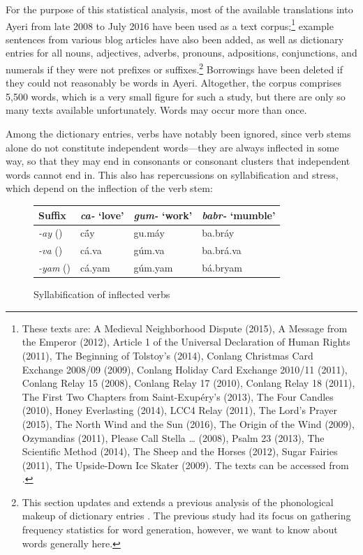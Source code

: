 For the purpose of this statistical analysis, most of the available 
translations into Ayeri from late 2008 to July 2016 have been used as a text 
corpus;\footnote{These texts are:
A Medieval Neighborhood Dispute (2015),
A Message from the Emperor (2012),
Article 1 of the Universal Declaration of Human Rights (2011),
The Beginning of Tolstoy's  (2014),
Conlang Christmas Card Exchange 2008/09 (2009),
Conlang Holiday Card Exchange 2010/11 (2011),
Conlang Relay 15 (2008),
Conlang Relay 17 (2010),
Conlang Relay 18 (2011),
The First Two Chapters from Saint-Exupéry's  (2013),
The Four Candles (2010),
Honey Everlasting (2014),
LCC4 Relay (2011),
The Lord's Prayer (2015),
The North Wind and the Sun (2016),
The Origin of the Wind (2009),
Ozymandias (2011),
Please Call Stella … (2008),
Psalm 23 (2013),
The Scientific Method (2014),
The Sheep and the Horses (2012),
Sugar Fairies (2011),
The Upside-Down Ice Skater (2009).
The texts can be accessed from \citet[Examples]{benung}.
} example sentences from 
various blog articles have also been added, as well as dictionary entries for 
all nouns, adjectives, adverbs, pronouns, adpositions, conjunctions, and 
numerals if they were not prefixes or suffixes.\footnote{This section updates 
and extends a previous analysis of the phonological makeup of dictionary 
entries 
\autocite{becker:frequency}. The previous study had its focus on gathering 
frequency statistics for word generation, however, we want to know about words 
generally here.} Borrowings have been deleted if they could not reasonably be 
words in Ayeri. Altogether, the corpus comprises 5,500 words, which is a very 
small figure for such a study, but there are only so many texts available 
unfortunately. Words may occur more than once.

Among the dictionary entries, verbs have notably been ignored, since verb stems 
alone do not constitute independent words---they are always inflected in some 
way, so that they may end in consonants or consonant clusters that independent 
words cannot end in. This also has repercussions on syllabification and stress, 
which depend on the inflection of the verb stem:

\begin{figure}[h]
\caption{Syllabification of inflected verbs}
\begin{tabu} to \linewidth {X[2l] X[3c] X[3c] X[3c]}
\toprule\tableheaderfont
Suffix
	& \emph{ca-} `love'
	& \emph{gum-} `work'
	& \emph{babr-} `mumble'
	\\

\toprule

\emph{-ay} (\Fsg{})
	& cā́y
	& gu.máy
	& ba.bráy
	\\

\emph{-va} (\Ssg{})
	& cá.va
	& gúm.va
	& ba.brá.va
	\\

\emph{-yam} (\Ptcp{})
	& cá.yam
	& gúm.yam
	& bá.bryam
	\\

\bottomrule
\end{tabu}
\label{fig:verbsyll}
\end{figure}

